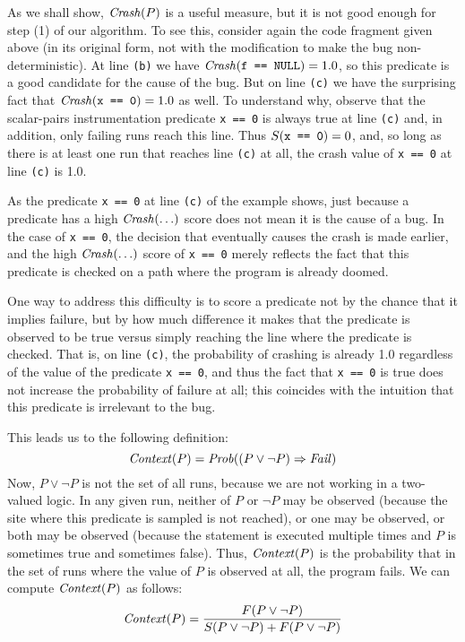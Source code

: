 As we shall show, $\mbox{\textit{Crash}}(P)$ is a useful measure, but it is not good
enough for step (1) of our algorithm. To see this, consider again the
code fragment given above (in its original form, not with the
modification to make the bug non-deterministic).  At line {\tt (b)} we
have $\mbox{\textit{Crash}}(\mbox{\tt f == NULL}) = 1.0$, so this predicate is a good
candidate for the cause of the bug.
But on line {\tt (c)} we have the surprising fact that $\mbox{\textit{Crash}}(\mbox{\tt x == 0}) = 1.0$ as well.
To understand why, observe that the scalar-pairs instrumentation
predicate \texttt{x == 0} is always true at line {\tt (c)} and, in
addition,
only failing runs reach this line.
Thus $S(\mbox{\tt x == 0}) = 0$, and, so long as there is at least one run that
reaches line {\tt (c)} at all, the crash value of {\tt x == 0} at line {\tt (c)} is 1.0.

As the predicate {\tt x == 0} at line {\tt (c)} of the example
shows, just because a predicate has a high $\mbox{\textit{Crash}}(\ldots)$ score does not
mean it is the cause of a bug.  In the case of {\tt x == 0}, the
decision that eventually causes the crash is made earlier, and the
high $\mbox{\textit{Crash}}(\ldots)$ score of {\tt x == 0} merely reflects the fact that this
predicate is checked on a path where the program is already doomed.

One way to address this difficulty is to score a predicate not by the chance
that it implies failure, but by how much difference it makes that the predicate
is observed to be true versus simply reaching the line where the predicate is checked.
That is, on line {\tt (c)}, the probability of crashing is already 1.0 regardless
of the value of the predicate {\tt x == 0}, and thus the fact that {\tt x == 0} is
true does not increase the probability of failure at all; this coincides with
the intuition that this predicate is irrelevant to the bug.

This leads us to the following definition:
\[ \mbox{\textit{Context}}(P) = \mbox{\textit{Prob}}((P \lor \lnot P) \Rightarrow \mbox{\textit{Fail}}) \]
Now, $P \lor \lnot P$ is not the set of all runs, because we are not working in a two-valued logic.
In any given run, neither of $P$ or $\lnot P$ may be observed (because the site where this predicate is
sampled is not reached), or one may be observed, or both may be observed (because the statement is executed
multiple times and $P$ is sometimes true and sometimes false).  Thus, $\mbox{\textit{Context}}(P)$ is the probability that
in the set of runs where the value of $P$ is observed at all, the program fails. We can compute $\mbox{\textit{Context}}(P)$ as follows:
\[ \mbox{\textit{Context}}(P) = \frac{F(P \lor \lnot P)}{S(P \lor \lnot P) + F(P \lor \lnot P)} \]

